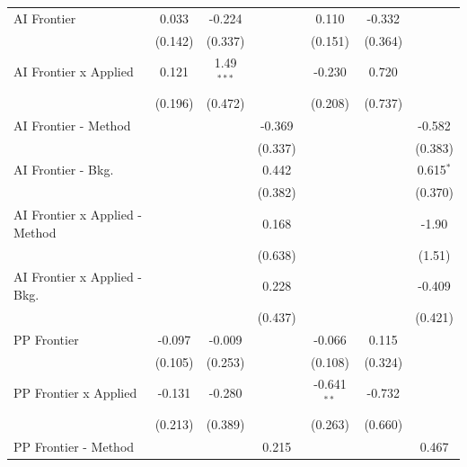 \begin{tabular}{lcccccc}
   AI Frontier                    & 0.033   & -0.224       &               & 0.110         & -0.332       &   \\   
                                  & (0.142) & (0.337)      &               & (0.151)       & (0.364)      &   \\   
   AI Frontier x Applied          & 0.121   & 1.49$^{***}$ &               & -0.230        & 0.720        &   \\   
                                  & (0.196) & (0.472)      &               & (0.208)       & (0.737)      &   \\   
   AI Frontier - Method           &         &              & -0.369        &               &              & -0.582\\   
                                  &         &              & (0.337)       &               &              & (0.383)\\   
   AI Frontier - Bkg.             &         &              & 0.442         &               &              & 0.615$^{*}$\\   
                                  &         &              & (0.382)       &               &              & (0.370)\\   
   AI Frontier x Applied - Method &         &              & 0.168         &               &              & -1.90\\   
                                  &         &              & (0.638)       &               &              & (1.51)\\   
   AI Frontier x Applied - Bkg.   &         &              & 0.228         &               &              & -0.409\\   
                                  &         &              & (0.437)       &               &              & (0.421)\\   
   PP Frontier                    & -0.097  & -0.009       &               & -0.066        & 0.115        &   \\   
                                  & (0.105) & (0.253)      &               & (0.108)       & (0.324)      &   \\   
   PP Frontier x Applied          & -0.131  & -0.280       &               & -0.641$^{**}$ & -0.732       &   \\   
                                  & (0.213) & (0.389)      &               & (0.263)       & (0.660)      &   \\   
   PP Frontier - Method           &         &              & 0.215         &               &              & 0.467\\   

\end{tabular}
